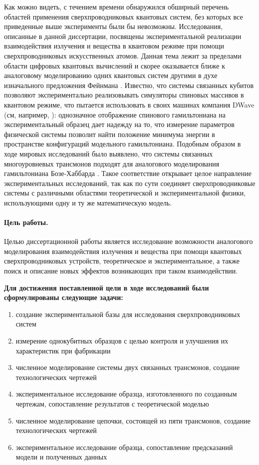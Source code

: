 \documentclass[14pt, a4paper]{extarticle}
\begin{document}
Как можно видеть, с течением времени обнаружился обширный перечень областей применения сверхпроводниковых квантовых систем, без которых все приведенные выше эксперименты были бы невозможны. Исследования, описанные в данной диссертации, посвящены экспериментальной реализации взаимодействия излучения и вещества в квантовом режиме при помощи сверхпроводниковых искусственных атомов. Данная тема лежит за пределами области цифровых квантовых вычислений и скорее оказывается ближе к аналоговому моделированию одних квантовых систем другими в духе изначального предложения Фейнмана \cite{feynman1982simulating}. Известно, что системы связанных кубитов позволяют экспериментально реализовывать симуляторы спиновых массивов в квантовом режиме, что пытается использовать в своих машинах компания DWave (см, например, \cite{harris2018phase}): однозначное отображение спинового гамильтониана на экспериментальный образец дает надежду на то, что измерение параметров физической системы позволит найти положение минимума энергии в пространстве конфигураций модельного гамильтониана. Подобным образом в ходе мировых исследований было выявлено, что системы связанных многоуровневых трансмонов подходят для аналогового моделирования гамильтониана Бозе-Хаббарда \cite{Orell2019, Ma2019, Hacohen-Gourgy2015, Deng2016, Ye2019, Yan2019}. Такое соответствие открывает целое направление экспериментальных исследований, так как по сути соединяет сверхпроводниковые системы с различными областями теоретической и экспериментальной физики, использующими одну и ту же математическую модель.

\paragraph{Цель работы.} Целью диссертационной работы является исследование возможности аналогового моделирования взаимодействия излучения и вещества при помощи квантовых сверхпроводниковых устройств, теоретическое и экспериментальное, а также поиск и описание новых эффектов возникающих при таком взаимодействии.

\textbf{Для достижения поставленной цели в ходе исследований были сформулированы следующие задачи:}

\begin{enumerate}
	\item создание экспериментальной базы для исследования сверхпроводниковых систем
	\item измерение однокубитных образцов с целью контроля и улучшения их характеристик при фабрикации
	\item численное моделирование системы двух связанных трансмонов, создание технологических чертежей
	\item экспериментальное исследование образца, изготовленного по созданным чертежам, сопоставление результатов с теоретической моделью
	\item численное моделирование цепочки, состоящей из пяти трансмонов, создание технологических чертежей
	\item экспериментальное исследование образца, сопоставление предсказаний модели и полученных данных
\end{enumerate}
\end{document}

